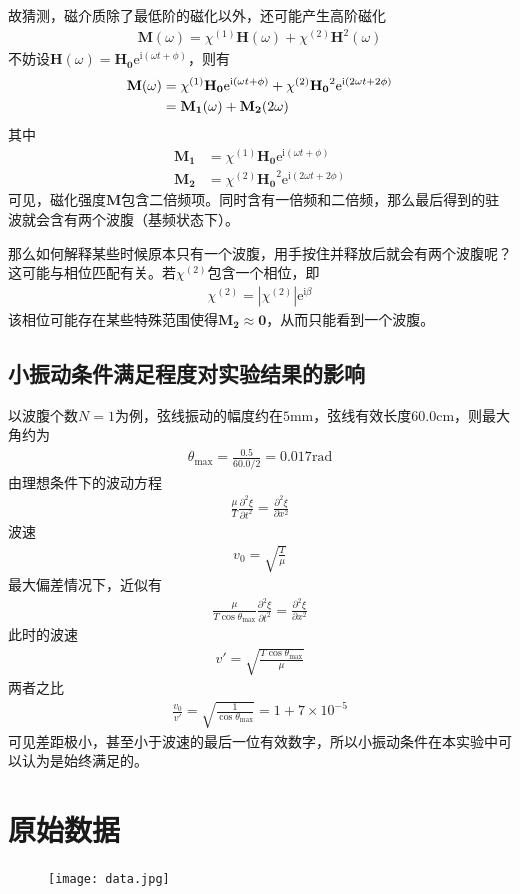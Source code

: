 \documentclass{ctexart}
\begin{document}
	故猜测，磁介质除了最低阶的磁化以外，还可能产生高阶磁化
	\begin{align}
		\mathbf{M}(\omega)=\chi^{(1)}\mathbf{H}(\omega)+\chi^{(2)}\mathbf{H}^2(\omega)
	\end{align}
	不妨设$\mathbf{H}(\omega)=\mathbf{H_0}\mathrm{e}^{\mathrm{i}(\omega t+\phi)}$，则有
	\begin{align}
		\mathbf{M}(\omega)&=\chi^{(1)}\mathbf{H_0}\mathrm{e}^{\mathrm{i}(\omega t+\phi)}+\chi^{(2)}\mathbf{H_0}^2\mathrm{e}^{\mathrm{i}(2\omega t+2\phi)}\\&=\mathbf{M_1}(\omega)+\mathbf{M_2}(2\omega)\notag
	\end{align}
	其中
	\begin{align}
		\mathbf{M_1}&=\chi^{(1)}\mathbf{H_0}\mathrm{e}^{\mathrm{i}(\omega t+\phi)}\\
		\mathbf{M_2}&=\chi^{(2)}\mathbf{H_0}^2\mathrm{e}^{\mathrm{i}(2\omega t+2\phi)}
	\end{align}
	可见，磁化强度$\mathbf{M}$包含二倍频项。同时含有一倍频和二倍频，那么最后得到的驻波就会含有两个波腹（基频状态下）。
	
	那么如何解释某些时候原本只有一个波腹，用手按住并释放后就会有两个波腹呢？这可能与相位匹配有关。若$\chi^{(2)}$包含一个相位，即
	\begin{align}
		\chi^{(2)}=|\chi^{(2)}|\mathrm{e}^{\mathrm{i}\beta}
	\end{align}
	该相位可能存在某些特殊范围使得$\mathbf{M_2}\approx \mathbf{0}$，从而只能看到一个波腹。
	\subsection{小振动条件满足程度对实验结果的影响}
	以波腹个数$N=1$为例，弦线振动的幅度约在$5\mathrm{mm}$，弦线有效长度$60.0\mathrm{cm}$，则最大角约为
	\begin{align}
		\theta_\text{max}=\frac{0.5}{60.0/2}=0.017\mathrm{rad}
	\end{align}
	由理想条件下的波动方程
	\begin{align}
		\frac{\mu}{T}\frac{\partial^2 \xi}{\partial t^2}=\frac{\partial^2 \xi}{\partial x^2}
	\end{align}
	波速
	\begin{align}
		v_0=\sqrt{\frac{T}{\mu}}
	\end{align}
	最大偏差情况下，近似有
	\begin{align}
		\frac{\mu}{T\cos{\theta_\text{max}}}\frac{\partial^2 \xi}{\partial t^2}=\frac{\partial^2 \xi}{\partial x^2}
	\end{align}
	此时的波速
	\begin{align}
		v'=\sqrt{\frac{T \cos{\theta_\text{max}}}{\mu}}
	\end{align}
	两者之比
	\begin{align}
		\frac{v_0}{v'}=\sqrt{\frac{1}{\cos{\theta_\text{max}}}}=1+7\times10^{-5}
	\end{align}
	可见差距极小，甚至小于波速的最后一位有效数字，所以小振动条件在本实验中可以认为是始终满足的。
	\section{原始数据}
	\begin{figure}[H]
		\centering
		\texttt{[image: data.jpg]}
	\end{figure}
\end{document}
